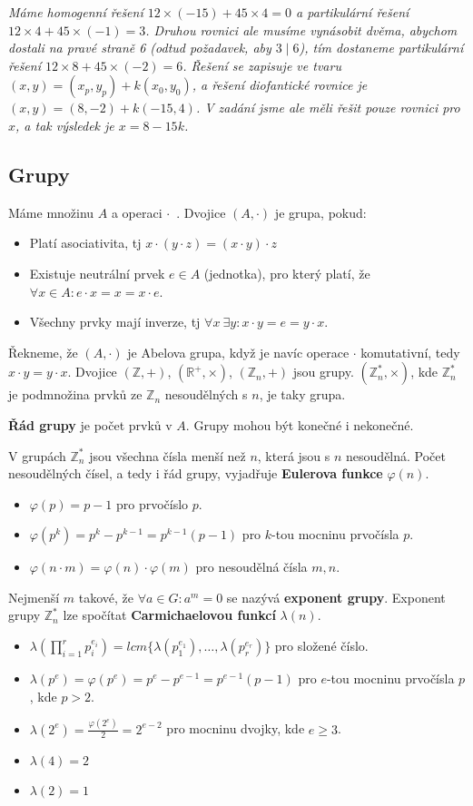 \documentclass[10pt,a4paper]{article}
\begin{document}
\textit{Máme homogenní řešení $12\times(-15) + 45\times 4 = 0$ a partikulární řešení $12\times4 + 45\times(-1) = 3$. Druhou rovnici ale musíme vynásobit dvěma, abychom dostali na pravé straně 6 (odtud požadavek, aby $3\mid6$), tím dostaneme partikulární řešení $12\times8 + 45\times(-2) = 6$. Řešení se zapisuje ve tvaru $(x,y) = (x_p,y_p) + k(x_0,y_0)$, a řešení diofantické rovnice je $(x,y) = (8, -2) + k(-15,4)$. V zadání jsme ale měli řešit pouze rovnici pro $x$, a tak výsledek je $x = 8 - 15k$.}

\subsection{Grupy}
Máme množinu $A$ a operaci $\cdot$~. Dvojice $(A,\cdot)$ je grupa, pokud:
\begin{itemize}
\item Platí asociativita, tj $x\cdot(y\cdot z) = (x\cdot y)\cdot z$
\item Existuje neutrální prvek $e \in A$ (jednotka), pro který platí, že $\forall x \in A: e\cdot x = x = x \cdot e$.
\item Všechny prvky mají inverze, tj $\forall x ~\exists y: x\cdot y = e = y \cdot x$.
\end{itemize}
Řekneme, že $(A,\cdot)$ je Abelova grupa, když je navíc operace $\cdot$ komutativní, tedy $x\cdot y = y \cdot x$.
Dvojice $(\mathbb{Z}, +)$,  $(\mathbb{R}^+, \times)$,  $(\mathbb{Z}_n, +)$ jsou grupy. $(\mathbb{Z}_n^*, \times)$, kde $\mathbb{Z}_n^*$ je podmnožina prvků ze $\mathbb{Z}_n$ nesoudělných s $n$, je taky grupa.

\textbf{Řád grupy} je počet prvků v $A$. Grupy mohou být konečné i nekonečné.

V grupách $\mathbb{Z}_n^*$ jsou všechna čísla menší než $n$, která jsou s $n$ nesoudělná. Počet nesoudělných čísel, a tedy i řád grupy, vyjadřuje \textbf{Eulerova funkce} $\varphi(n)$.
\begin{itemize}
\item $\varphi(p) = p-1$ pro prvočíslo $p$.
\item $\varphi(p^k) = p^k - p^{k-1} = p^{k-1}(p-1)$ pro $k$-tou mocninu prvočísla $p$.
\item $\varphi(n\cdot m) = \varphi(n)\cdot\varphi(m)$ pro nesoudělná čísla $m,n$.
\end{itemize}

Nejmenší $m$ takové, že $\forall a \in G: a^m = 0$ se nazývá \textbf{exponent grupy}. Exponent grupy $\mathbb{Z}_n^*$ lze spočítat \textbf{Carmichaelovou funkcí} $\lambda(n)$.
\begin{itemize}
\item $\lambda(\prod_{i=1}^r p_i^{e_i}) = lcm\{\lambda(p_1^{e_1}), \ldots, \lambda(p_r^{e_r})\}$ pro složené číslo.
\item $\lambda(p^e) = \varphi(p^e) = p^e - p^{e-1} = p^{e-1}(p-1)$ pro $e$-tou mocninu prvočísla $p$, kde $p > 2$.
\item $\lambda(2^e) = \frac{\varphi(2^e)}{2} = 2^{e - 2}$ pro mocninu dvojky, kde $e \geq 3$.
\item $\lambda(4) = 2$
\item $\lambda(2) = 1$
\end{itemize}
\end{document}
